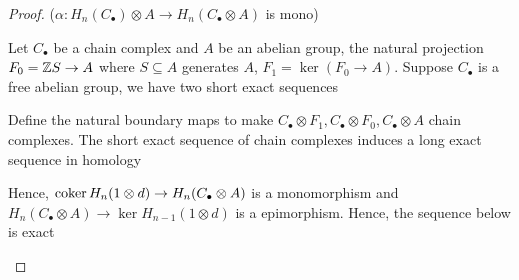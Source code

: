 \documentclass{report}
\begin{document}
\begin{proof}($\alpha: H_n(C_\bullet) \otimes A \to H_n(C_\bullet \otimes A)$ is mono)

Let $C_\bullet$ be a chain complex and $A$ be an abelian group, the natural projection $F_0 = \mathbb{Z} S \to A$ where $S \subseteq A$ generates $A$, $F_1 = \ker (F_0 \to A)$. Suppose $C_\bullet$ is a free abelian group, we have two short exact sequences
\begin{center}
\end{center}

Define the natural boundary maps to make $C_\bullet \otimes F_1, C_\bullet \otimes F_0, C_\bullet \otimes A$ chain complexes. The short exact sequence of chain complexes induces a long exact sequence in homology
\begin{center}
\end{center}

Hence, $\operatorname{coker} H_n(1 \otimes d) \to H_n(C_\bullet \otimes A)$ is a monomorphism and $H_n(C_\bullet \otimes A) \to \ker H_{n-1}(1 \otimes d)$ is a epimorphism. Hence, the sequence below is exact
\begin{center}
\end{center}


\end{proof}
\end{document}
